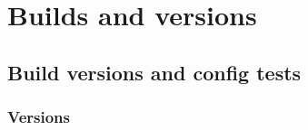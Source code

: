 \documentclass[letterpaper,table,10pt,english]{jupyterBook}
\begin{document}
\sphinxstepscope


\part{Builds and versions}

\sphinxstepscope


\chapter{Build versions and config tests}
\label{\detokenize{tests/build_versions_checks:build-versions-and-config-tests}}\label{\detokenize{tests/build_versions_checks::doc}}

\section{Versions}
\label{\detokenize{tests/build_versions_checks:versions}}
\end{document}
